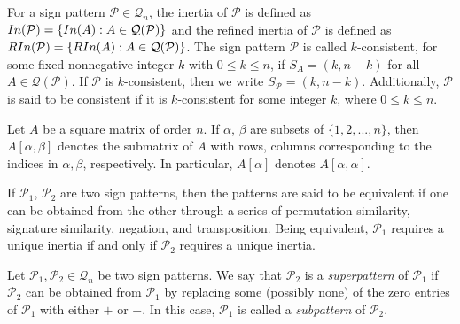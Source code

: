 \documentclass[10pt,a4paper]{amsart}
\numberwithin{equation}{section}
\def\In{{\rm In}}
\def\RIn{{\rm RIn}}
\begin{document}
	
	
	For a sign pattern $\mathcal{P} \in \mathcal{Q}_n$, the inertia of $\mathcal{P}$ is defined as $\In(\mathcal{P})=\{\In(A): A\in \mathcal{Q}(\mathcal{P})\}$ and the refined
	inertia of $\mathcal{P}$ is defined as $\RIn(\mathcal{P})=\{\RIn(A): A\in \mathcal{Q}(\mathcal{P})\}$. The sign pattern $\mathcal{P}$ is called $k$-consistent, for some fixed nonnegative integer $k$ with $0\leq k \leq n$, if $S_A=(k,n-k)$ for all $A\in \mathcal{Q}(\mathcal{P})$. If $\mathcal{P}$ is $k$-consistent, then we write $S_{\mathcal{P}}=(k,n-k)$. Additionally, $\mathcal{P}$ is said to be consistent if it is $k$-consistent for some integer $k$, where $0\leq k\leq n$.
	
	Let $A$ be a square matrix of order $n$. If $\alpha$, $\beta$ are subsets of $\{1,2,...,n\}$, then $A[\alpha,\beta]$ denotes the submatrix of $A$ with rows, columns corresponding to the indices in $\alpha, \beta$, respectively. In particular, $A[\alpha]$ denotes $A[\alpha, \alpha]$.
	
	
	
	If $\mathcal{P}_1$, $\mathcal{P}_2$ are two sign patterns, then the patterns are said to be equivalent if one can be obtained from
	the other through a series of permutation similarity, signature similarity, negation, and transposition. Being
	equivalent, $\mathcal{P}_1$ requires a unique inertia if and only if $\mathcal{P}_2$ requires a unique inertia.
	
	Let $\mathcal{P}_1, \mathcal{P}_2 \in \mathcal{Q}_n$ be two sign patterns. We say that $\mathcal{P}_2$ is a \textit{superpattern} of $\mathcal{P}_1$ if $\mathcal{P}_2$ can be obtained from $\mathcal{P}_1$ by replacing some (possibly none) of the zero entries of $\mathcal{P}_1$ with either $+$ or $-$. In this case, $\mathcal{P}_1$ is called a \textit{subpattern} of $\mathcal{P}_2$.
	
	
	
\end{document}
